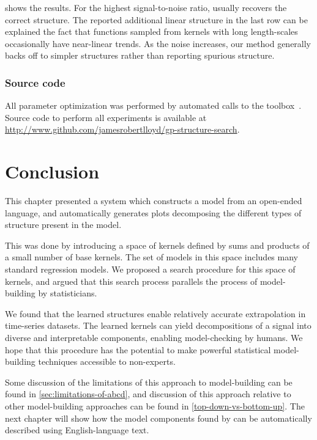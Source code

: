  shows the results.
For the highest signal-to-noise ratio, \procedurename{} usually recovers the correct structure.
The reported additional linear structure in the last row can be explained the fact that functions sampled from \kSE{} kernels with long length-scales occasionally have near-linear trends.
As the noise increases, our method generally backs off to simpler structures rather than reporting spurious structure.

\subsubsection{Source code}
All \gp{} parameter optimization was performed by automated calls to the \GPML{} toolbox~\citep{GPML}.
Source code to perform all experiments is available at \url{http://www.github.com/jamesrobertlloyd/gp-structure-search}.




\section{Conclusion}

This chapter presented a system which constructs a model from an open-ended language, and automatically generates plots decomposing the different types of structure present in the model.

This was done by introducing a space of kernels defined by sums and products of a small number of base kernels.  
The set of models in this space includes many standard regression models.
We proposed a search procedure for this space of kernels, and argued that this search process parallels the process of model-building by statisticians.

We found that the learned structures enable relatively accurate extrapolation in time-series datasets. %
The learned kernels can yield decompositions of a signal into diverse and interpretable components, enabling model-checking by humans.
We hope that this procedure has the potential to make powerful statistical model-building techniques accessible to non-experts.

Some discussion of the limitations of this approach to model-building can be found in \cref{sec:limitations-of-abcd}, and discussion of this approach relative to other model-building approaches can be found in \cref{top-down-vs-bottom-up}.
The next chapter will show how the model components found by \procedurename{} can be automatically described using English-language text.




